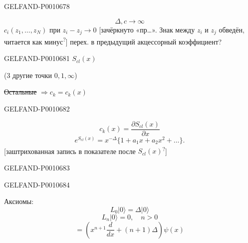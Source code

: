 \begin{GelfandAdjacentEvidence}{GELFAND-P001067}{8}

\begin{equation*}
\Delta,c\to\infty
\end{equation*}
$c_i(z_1,\ldots,z_N)$ при $z_i-z_j\to0$ [зачёркнуто «пр…». Знак между \(z_i\) и \(z_j\) обведён, читается как минус\textsuperscript{?}] перех. в предыдущий акцессорный коэффициент?
\end{GelfandAdjacentEvidence}



\begin{GelfandAdjacentEvidence}{GELFAND-P001068}{1}
$S_{cl}(x)$

(3 другие точки $0,1,\infty$)

\sout{Остальные} $\Rightarrow c_k=c_k(x)$
\end{GelfandAdjacentEvidence}
\begin{GelfandAdjacentEvidence}{GELFAND-P001068}{2}

\begin{equation*}
c_k(x)=\frac{\partial S_{cl}(x)}{\partial x}
\end{equation*}
\begin{equation*}
e^{S_{cl}(x)}=x^{-\Delta}\{1+a_1x+a_2x^2+\ldots\}.
\end{equation*}
[заштрихованная запись в показателе после \(S_{cl}(x)\)\textsuperscript{?}]
\end{GelfandAdjacentEvidence}
\begin{GelfandAdjacentEvidence}{GELFAND-P001068}{3}

\end{GelfandAdjacentEvidence}
\begin{GelfandAdjacentEvidence}{GELFAND-P001068}{4}


Аксиомы:
\begin{equation*}
L_0|0\rangle=\Delta|0\rangle
\end{equation*}
\begin{equation*}
L_n|0\rangle=0,\quad n>0
\end{equation*}
\begin{equation*}
[L_n,\psi(x)]=\left(x^{n+1}\frac{d}{dx}+(n+1)\Delta\right)\psi(x)
\end{equation*}
\end{GelfandAdjacentEvidence}
